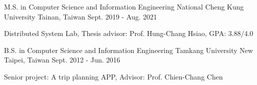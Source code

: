 

\begin{cventries}

  \cventry
    {M.S. in Computer Science and Information Engineering} %
    {National Cheng Kung University} %
    {Tainan, Taiwan} %
    {Sept. 2019 - Aug. 2021} %
    {
      \begin{cvitems} %
        \item {Distributed System Lab, Thesis advisor: Prof. Hung-Chang Hsiao, GPA: 3.88/4.0}
      \end{cvitems}
    }

  \cventry
    {B.S. in Computer Science and Information Engineering} %
    {Tamkang University} %
    {New Taipei, Taiwan} %
    {Sept. 2012 - Jun. 2016} %
    {
      \begin{cvitems} %
        \item {Senior project: A trip planning APP, Advisor: Prof. Chien-Chang Chen}
      \end{cvitems}
    }

\end{cventries}
